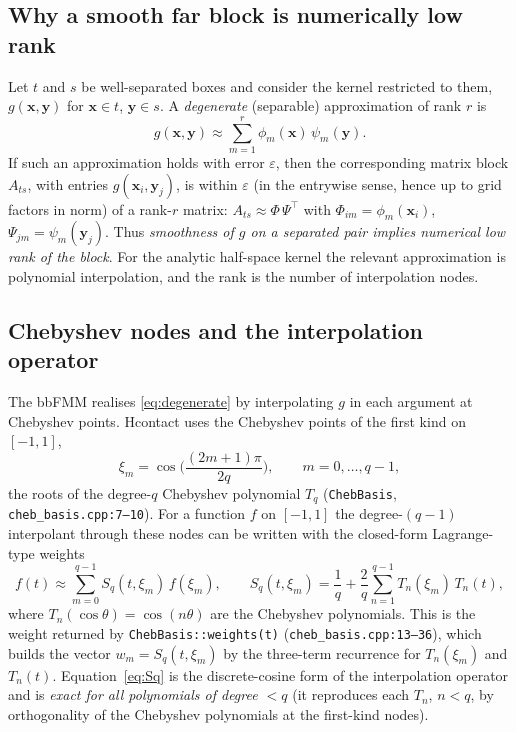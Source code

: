 \documentclass[11pt,a4paper]{article}
\newcommand{\xx}{\mathbf{x}}
\newcommand{\yy}{\mathbf{y}}
\newcommand{\code}[1]{\texttt{#1}}
\theoremstyle{definition}
\theoremstyle{remark}
\begin{document}
\subsection{Why a smooth far block is numerically low rank}

Let $t$ and $s$ be well-separated boxes and consider the kernel restricted to
them, $g(\xx,\yy)$ for $\xx\in t$, $\yy\in s$. A \emph{degenerate} (separable)
approximation of rank $r$ is
\begin{equation}
  g(\xx,\yy)\approx \sum_{m=1}^{r} \phi_m(\xx)\,\psi_m(\yy).
  \label{eq:degenerate}
\end{equation}
If such an approximation holds with error $\varepsilon$, then the corresponding
matrix block $A_{ts}$, with entries $g(\xx_i,\yy_j)$, is within $\varepsilon$ (in
the entrywise sense, hence up to grid factors in norm) of a rank-$r$ matrix:
$A_{ts}\approx \Phi\,\Psi^\top$ with $\Phi_{im}=\phi_m(\xx_i)$,
$\Psi_{jm}=\psi_m(\yy_j)$. Thus \emph{smoothness of $g$ on a separated pair
implies numerical low rank of the block}. For the analytic half-space kernel the
relevant approximation is polynomial interpolation, and the rank is the number
of interpolation nodes.

\subsection{Chebyshev nodes and the interpolation operator}
\label{sec:cheb}

The bbFMM realises \eqref{eq:degenerate} by interpolating $g$ in each argument at
Chebyshev points. Hcontact uses the Chebyshev points of the first kind on
$[-1,1]$,
\begin{equation}
  \xi_m = \cos\!\Big(\frac{(2m+1)\pi}{2q}\Big), \qquad m=0,\dots,q-1,
  \label{eq:cheb-nodes}
\end{equation}
the roots of the degree-$q$ Chebyshev polynomial $T_q$ (\code{ChebBasis},
\code{cheb\_basis.cpp:7--10}). For a function $f$ on $[-1,1]$ the degree-$(q{-}1)$
interpolant through these nodes can be written with the closed-form Lagrange-type
weights
\begin{equation}
  f(t) \approx \sum_{m=0}^{q-1} S_q(t,\xi_m)\, f(\xi_m),
  \qquad
  S_q(t,\xi_m) = \frac{1}{q} + \frac{2}{q}\sum_{n=1}^{q-1} T_n(\xi_m)\,T_n(t),
  \label{eq:Sq}
\end{equation}
where $T_n(\cos\theta)=\cos(n\theta)$ are the Chebyshev polynomials. This is the
weight returned by \code{ChebBasis::weights(t)} (\code{cheb\_basis.cpp:13--36}),
which builds the vector $w_m=S_q(t,\xi_m)$ by the three-term recurrence for
$T_n(\xi_m)$ and $T_n(t)$. Equation~\eqref{eq:Sq} is the discrete-cosine form of
the interpolation operator and is \emph{exact for all polynomials of degree
$<q$} (it reproduces each $T_n$, $n<q$, by orthogonality of the Chebyshev
polynomials at the first-kind nodes).
\end{document}
